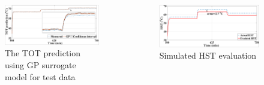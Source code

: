 \documentclass[10pt,hyperref={pdfpagelabels=false}]{beamer}
\begin{document}
\begin{frame}[fragile]
\begin{columns}
\begin{figure}
    \includegraphics[scale=0.20]{Images/Figure_final_extrapolate_R2.png}
    \caption{The TOT prediction using GP surrogate model for test data  }
    \label{fig:Problem_5_1_1}
\end{figure}
\begin{figure}
    \centering
    \includegraphics[scale=0.19]{Images/HST_virtual.png}
    \caption{Simulated HST evaluation }
    \label{fig:Problem_5_1_1}
\end{figure}
\end{columns}
\end{frame}
\end{document}
